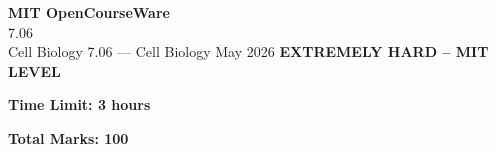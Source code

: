 \documentclass[12pt,a4paper]{exam}
\begin{document}
\begin{center}
{\LARGE \textbf{MIT OpenCourseWare}}\\7.06\\Cell Biology
\vspace{0.5cm}
{7.06} --- {Cell Biology}
\vspace{0.3cm}
May 2026
\vspace{0.3cm}
\textbf{EXTREMELY HARD -- MIT LEVEL}
\end{center}

\begin{center}
\textbf{Time Limit: 3 hours}
\end{center}

\begin{center}
\textbf{Total Marks: 100}
\end{center}

\vspace{0.5cm}
\end{document}
